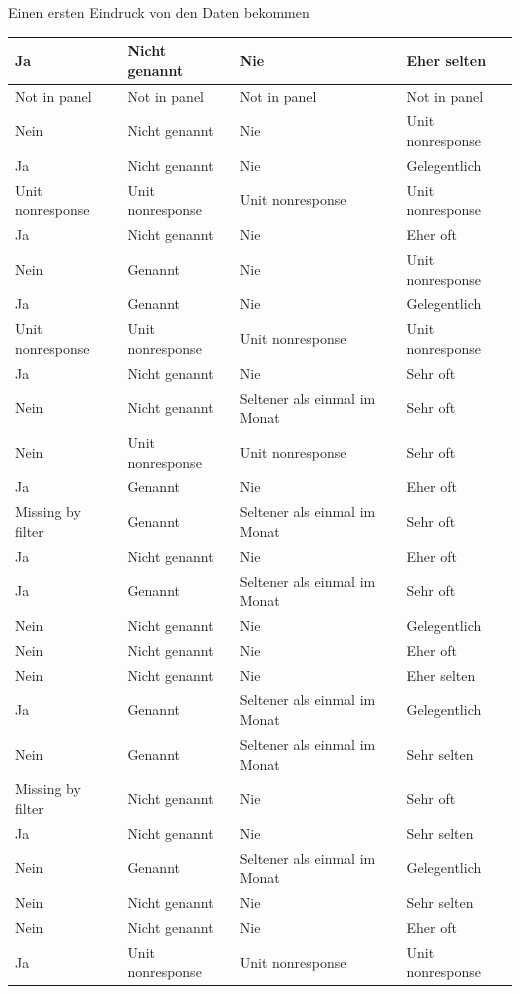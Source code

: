 \documentclass[ignorenonframetext,]{beamer}
\begin{document}
\begin{frame}{Einen ersten Eindruck von den Daten bekommen}
\begin{tabular}{l|l|l|l}
\hline
Ja & Nicht genannt & Nie & Eher selten\\
\hline
Not in panel & Not in panel & Not in panel & Not in panel\\
\hline
Nein & Nicht genannt & Nie & Unit nonresponse\\
\hline
Ja & Nicht genannt & Nie & Gelegentlich\\
\hline
Unit nonresponse & Unit nonresponse & Unit nonresponse & Unit nonresponse\\
\hline
Ja & Nicht genannt & Nie & Eher oft\\
\hline
Nein & Genannt & Nie & Unit nonresponse\\
\hline
Ja & Genannt & Nie & Gelegentlich\\
\hline
Unit nonresponse & Unit nonresponse & Unit nonresponse & Unit nonresponse\\
\hline
Ja & Nicht genannt & Nie & Sehr oft\\
\hline
Nein & Nicht genannt & Seltener als einmal im Monat & Sehr oft\\
\hline
Nein & Unit nonresponse & Unit nonresponse & Sehr oft\\
\hline
Ja & Genannt & Nie & Eher oft\\
\hline
Missing by filter & Genannt & Seltener als einmal im Monat & Sehr oft\\
\hline
Ja & Nicht genannt & Nie & Eher oft\\
\hline
Ja & Genannt & Seltener als einmal im Monat & Sehr oft\\
\hline
Nein & Nicht genannt & Nie & Gelegentlich\\
\hline
Nein & Nicht genannt & Nie & Eher oft\\
\hline
Nein & Nicht genannt & Nie & Eher selten\\
\hline
Ja & Genannt & Seltener als einmal im Monat & Gelegentlich\\
\hline
Nein & Genannt & Seltener als einmal im Monat & Sehr selten\\
\hline
Missing by filter & Nicht genannt & Nie & Sehr oft\\
\hline
Ja & Nicht genannt & Nie & Sehr selten\\
\hline
Nein & Genannt & Seltener als einmal im Monat & Gelegentlich\\
\hline
Nein & Nicht genannt & Nie & Sehr selten\\
\hline
Nein & Nicht genannt & Nie & Eher oft\\
\hline
Ja & Unit nonresponse & Unit nonresponse & Unit nonresponse\\

\end{tabular}
\end{frame}
\end{document}
